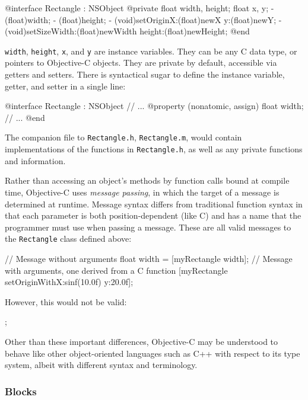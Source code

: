 \begin{objc}
@interface Rectangle : NSObject {
    @private
    float width, height;
    float x, y;
}
- (float)width;
- (float)height;
- (void)setOriginX:(float)newX y:(float)newY;
- (void)setSizeWidth:(float)newWidth height:(float)newHeight;
@end
\end{objc}

\texttt{width}, \texttt{height}, \texttt{x}, and \texttt{y} are instance
variables. They can be any C data type, or pointers to Objective-C objects. They
are private by default, accessible via getters and setters. There is syntactical
sugar to define the instance variable, getter, and setter in a single line:

\begin{objc}
@interface Rectangle : NSObject {
    // ...
}
@property (nonatomic, assign) float width;
// ...
@end
\end{objc}

The companion file to \texttt{Rectangle.h}, \texttt{Rectangle.m}, would contain
implementations of the functions in \texttt{Rectangle.h}, as well as any private
functions and information.

Rather than accessing an object's methods by function calls bound at compile
time, Objective-C uses \emph{message passing}, in which the target of a message
is determined at runtime. Message syntax differs from traditional function
syntax in that each parameter is both position-dependent (like C) and has a name
that the programmer must use when passing a message. These are all valid
messages to the \texttt{Rectangle} class defined above:

\begin{objc}
// Message without arguments
float width = [myRectangle width];
// Message with arguments, one derived from a C function
[myRectangle setOriginWithX:sinf(10.0f) y:20.0f];
\end{objc}

However, this would not be valid:

\begin{objc}
;
\end{objc}

Other than these important differences, Objective-C may be understood to behave
like other object-oriented languages such as C++ with respect to its type
system, albeit with different syntax and terminology.

\subsubsection{Blocks}
\label{sect:objc_blocks}

